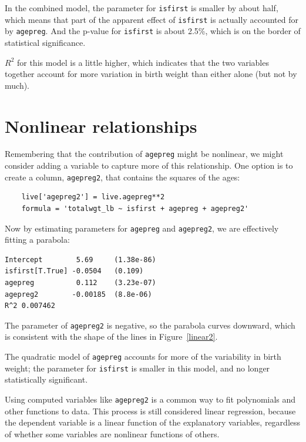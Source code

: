 \documentclass[12pt]{book}
\begin{document}
In the combined model, the parameter for \verb"isfirst" is smaller
by about half, which means that part of the apparent effect of
\verb"isfirst" is actually accounted for by \verb"agepreg".  And
the p-value for \verb"isfirst" is about 2.5\%, which is on the
border of statistical significance.

$R^2$ for this model is a little higher, which indicates that the
two variables together account for more variation in birth weight
than either alone (but not by much).


\section{Nonlinear relationships}
\label{nonlinear}

Remembering that the contribution of \verb"agepreg" might be nonlinear,
we might consider adding a variable to capture more of this
relationship.  One option is to create a column, \verb"agepreg2",
that contains the squares of the ages:

\begin{verbatim}
    live['agepreg2'] = live.agepreg**2
    formula = 'totalwgt_lb ~ isfirst + agepreg + agepreg2'
\end{verbatim}

Now by estimating parameters for \verb"agepreg" and \verb"agepreg2",
we are effectively fitting a parabola:

\begin{verbatim}
Intercept        5.69     (1.38e-86)
isfirst[T.True] -0.0504   (0.109)
agepreg          0.112    (3.23e-07)
agepreg2        -0.00185  (8.8e-06)
R^2 0.007462
\end{verbatim}

The parameter of \verb"agepreg2" is negative, so the parabola
curves downward, which is consistent with the shape of the lines
in Figure~\ref{linear2}.

The quadratic model of \verb"agepreg" accounts for more of the
variability in birth weight; the parameter for \verb"isfirst"
is smaller in this model, and no longer statistically significant.
   

Using computed variables like \verb"agepreg2" is a common way to
fit polynomials and other functions to data.  
This process is still considered linear
regression, because the dependent variable is a linear function of
the explanatory variables, regardless of whether some variables
are nonlinear functions of others.
\end{document}
